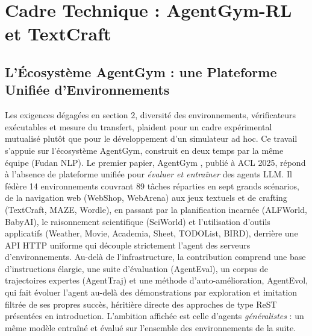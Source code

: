 \documentclass[11pt,a4paper]{article}
\begin{document}








\newpage
\section{Cadre Technique : AgentGym-RL et TextCraft}


\subsection{L'Écosystème AgentGym : une Plateforme Unifiée d'Environnements}

Les exigences dégagées en section 2, diversité des environnements, vérificateurs exécutables et mesure du transfert, plaident pour un cadre expérimental mutualisé plutôt que pour le développement d'un simulateur ad hoc. Ce travail s'appuie sur l'écosystème AgentGym, construit en deux temps par la même équipe (Fudan NLP). Le premier papier, AgentGym \cite{xi_agentgym_2025}, publié à ACL 2025, répond à l'absence de plateforme unifiée pour \emph{évaluer et entraîner} des agents LLM. Il fédère 14 environnements couvrant 89 tâches réparties en sept grands scénarios, de la navigation web (WebShop, WebArena) aux jeux textuels et de crafting (TextCraft, MAZE, Wordle), en passant par la planification incarnée (ALFWorld, BabyAI), le raisonnement scientifique (SciWorld) et l'utilisation d'outils applicatifs (Weather, Movie, Academia, Sheet, TODOList, BIRD), derrière une API HTTP uniforme qui découple strictement l'agent des serveurs d'environnements. Au-delà de l'infrastructure, la contribution comprend une base d'instructions élargie, une suite d'évaluation (AgentEval), un corpus de trajectoires expertes (AgentTraj) et une méthode d'auto-amélioration, AgentEvol, qui fait évoluer l'agent au-delà des démonstrations par exploration et imitation filtrée de ses propres succès, héritière directe des approches de type ReST présentées en introduction. L'ambition affichée est celle d'agents \emph{généralistes} : un même modèle entraîné et évalué sur l'ensemble des environnements de la suite.
\end{document}
